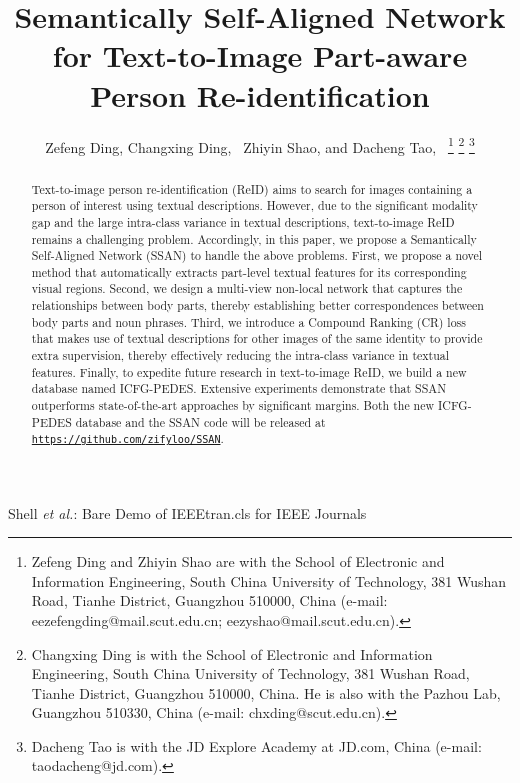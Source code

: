 \documentclass[journal]{IEEEtran}
\begin{document}
\title{Semantically Self-Aligned Network for Text-to-Image Part-aware Person Re-identification}


\author{Zefeng Ding,
        Changxing Ding,~
        Zhiyin Shao,
        and Dacheng Tao,~
\thanks{Zefeng Ding and Zhiyin Shao are with the School of Electronic and Information Engineering, South China University of Technology,
381 Wushan Road, Tianhe District, Guangzhou 510000, China (e-mail: eezefengding@mail.scut.edu.cn; eezyshao@mail.scut.edu.cn).}
\thanks{Changxing Ding is with the School of Electronic and Information Engineering, South China University of Technology,
381 Wushan Road, Tianhe District, Guangzhou 510000, China. He is also with the Pazhou Lab, Guangzhou 510330, China (e-mail: chxding@scut.edu.cn).}
\thanks{Dacheng Tao is with the JD Explore Academy at JD.com, China (e-mail: taodacheng@jd.com).} }


\markboth{} 
{Shell \MakeLowercase{\textit{et al.}}: Bare Demo of IEEEtran.cls for IEEE Journals}














\maketitle

\begin{abstract}
Text-to-image person re-identification (ReID) aims to search for images containing a person of interest using textual descriptions. However, due to the significant modality gap and the large intra-class variance in textual descriptions, text-to-image ReID remains a challenging problem. Accordingly, in this paper, we propose a Semantically Self-Aligned Network (SSAN) to handle the above problems. First, we propose a novel method that automatically extracts part-level textual features for its corresponding visual regions. Second, we design a multi-view non-local network that captures the relationships between body parts, thereby establishing better correspondences between body parts and noun phrases. Third, we introduce a Compound Ranking (CR) loss that makes use of textual descriptions for other images of the same identity to provide extra supervision, thereby effectively reducing the intra-class variance in textual features. Finally, to expedite future research in text-to-image ReID, we build a new database named ICFG-PEDES. Extensive experiments demonstrate that SSAN outperforms state-of-the-art approaches by significant margins.
Both the new ICFG-PEDES database and the SSAN code will be released at \texttt{\url{https://github.com/zifyloo/SSAN}}.
\end{abstract}
\end{document}
